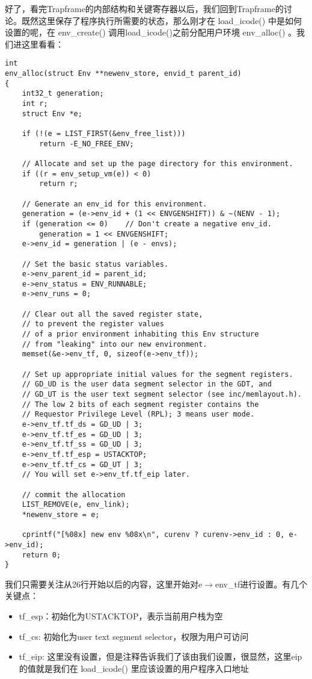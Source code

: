 \documentclass{article}
\newcommand{\funcname}[1]{{\ttfamily \small #1}}
\begin{document}
\begin{CJK*}{UTF8}{gkai}
好了，看完Trapframe的内部结构和关键寄存器以后，我们回到Trapframe的讨论。既然这里保存了程序执行所需要的状态，那么刚才在 \funcname{load\_icode()} 中是如何设置的呢，在 \funcname {env\_create() }调用\funcname{load\_icode()}之前分配用户环境 \funcname{env\_alloc()} 。我们进这里看看：

\begin{lstlisting}[style=ccode, title={\scriptsize \ttfamily \bfseries kern/env.c: env\_alloc()}]
int
env_alloc(struct Env **newenv_store, envid_t parent_id)
{
	int32_t generation;
	int r;
	struct Env *e;

	if (!(e = LIST_FIRST(&env_free_list)))
		return -E_NO_FREE_ENV;

	// Allocate and set up the page directory for this environment.
	if ((r = env_setup_vm(e)) < 0)
		return r;

	// Generate an env_id for this environment.
	generation = (e->env_id + (1 << ENVGENSHIFT)) & ~(NENV - 1);
	if (generation <= 0)	// Don't create a negative env_id.
		generation = 1 << ENVGENSHIFT;
	e->env_id = generation | (e - envs);
	
	// Set the basic status variables.
	e->env_parent_id = parent_id;
	e->env_status = ENV_RUNNABLE;
	e->env_runs = 0;

	// Clear out all the saved register state,
	// to prevent the register values
	// of a prior environment inhabiting this Env structure
	// from "leaking" into our new environment.
	memset(&e->env_tf, 0, sizeof(e->env_tf));

	// Set up appropriate initial values for the segment registers.
	// GD_UD is the user data segment selector in the GDT, and 
	// GD_UT is the user text segment selector (see inc/memlayout.h).
	// The low 2 bits of each segment register contains the
	// Requestor Privilege Level (RPL); 3 means user mode.
	e->env_tf.tf_ds = GD_UD | 3;
	e->env_tf.tf_es = GD_UD | 3;
	e->env_tf.tf_ss = GD_UD | 3;
	e->env_tf.tf_esp = USTACKTOP;
	e->env_tf.tf_cs = GD_UT | 3;
	// You will set e->env_tf.tf_eip later.

	// commit the allocation
	LIST_REMOVE(e, env_link);
	*newenv_store = e;

	cprintf("[%08x] new env %08x\n", curenv ? curenv->env_id : 0, e->env_id);
	return 0;
}
\end{lstlisting}

我们只需要关注从26行开始以后的内容，这里开始对e$\rightarrow$env\_tf进行设置。有几个关键点：

\begin{itemize}
\item{tf\_esp：初始化为USTACKTOP，表示当前用户栈为空}
\item{tf\_cs: 初始化为user text segment selector，权限为用户可访问}
\item{tf\_eip: 这里没有设置，但是注释告诉我们了该由我们设置，很显然，这里eip的值就是我们在 \funcname{load\_icode()} 里应该设置的用户程序入口地址}
\end{itemize}


\end{CJK*}
\end{document}
